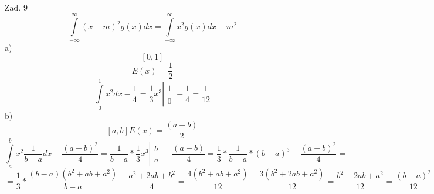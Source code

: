 \documentclass{article}
\begin{document}
Zad. 9    
$$
\int\limits_{-\infty}^{\infty}(x-m)^{2}g(x)dx= \int\limits_{-\infty}^{\infty}x^{2}g(x)dx-m^{2}
$$
a)
$$
[0,1]
$$
$$
E(x)=\frac{1}{2}
$$
$$
\int\limits_{0}^{1}x^{2}dx-\frac{1}{4}=\frac{1}{3}x^{3}\left|\begin{array}{ccc}1\\\\0\end{array}-\frac{1}{4}=\frac{1}{12}
$$
b)
$$
[a,b]E(x)=\frac{(a+b)}{2}
$$
$$
\int\limits_{a}^{b}x^{2}\frac{1}{b-a}dx-\frac{(a+b)^{2}}{4}=\frac{1}{b-a}*\frac{1}{3}x^{3}\left|\begin{array}{ccc}b\\\\a\end{array}-\frac{(a+b)}{4}=\frac{1}{3}*\frac{1}{b-a}*(b-a)^{3}-\frac{(a+b)^{2}}{4}=
$$
$$
=\frac{1}{3}*\frac{(b-a)(b^{2}+ab+a^{2})}{b-a}-\frac{a^{2}+2ab+b^{2}}{4}=\frac{4(b^{2}+ab+a^{2})}{12}-\frac{3(b^{2}+2ab+a^{2})}{12}=\frac{b^{2}-2ab+a^{2}}{12}=\frac{(b-a)^{2}}{12}
$$
\end{document}
